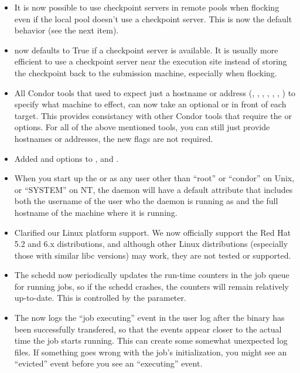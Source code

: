 \begin{itemize}
\item It is now possible to use checkpoint servers in remote pools
when flocking even if the local pool doesn't use a checkpoint server.
This is now the default behavior (see the next item).

\item {} now defaults to True if a checkpoint
server is available.  It is usually more efficient to use a checkpoint
server near the execution site instead of storing the checkpoint back
to the submission machine, especially when flocking.

\item All Condor tools that used to expect just a hostname or address 
(, , , ,
, , ) to specify
what machine to effect, can now take an optional  or
 in front of each target.
This provides consistancy with other Condor tools that require the
 or  options.
For all of the above mentioned tools, you can still just provide
hostnames or addresses, the new flags are not required.

\item Added  and  options to ,
 and .

\item When you start up the  or  as any
user other than ``root'' or ``condor'' on Unix, or ``SYSTEM'' on NT,
the daemon will have a default  attribute that includes
both the username of the user who the daemon is running as and the
full hostname of the machine where it is running.

\item Clarified our Linux platform support.  We now officially
support the Red Hat 5.2 and 6.x distributions, and although other Linux
distributions (especially those with similar libc versions) may work,
they are not tested or supported.

\item The schedd now periodically updates the run-time counters in the
job queue for running jobs, so if the schedd crashes, the counters
will remain relatively up-to-date.  This is controlled by the
 parameter.

\item The  now logs the ``job executing'' event in the
user log after the binary has been successfully transfered, so that
the events appear closer to the actual time the job starts running.
This can create some somewhat unexpected log files.  
If something goes wrong with the job's initialization, you might see
an ``evicted'' event before you see an ``executing'' event.

\end{itemize}

